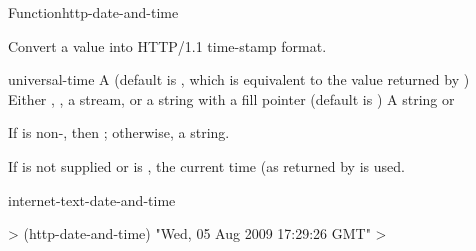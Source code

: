 \documentclass[10pt,twoside,english,pdftex]{article}
\begin{document}
\begin{functiondoc}{Function}{http-date-and-time}{%
    }
% 

\fnsyntax

\fnpurpose Convert a  value into HTTP/1.1 time-stamp format.

\fnpackage {}

\fnmodule {}

\fnargs
\begin{args}{universal-time}
 A  (default is \nil,
  which is equivalent to the value returned by
  )
\arg[destination] Either \nil, , a stream, or a string with a fill 
pointer (default is \nil)
\arg[result] A string or \nil{}
\end{args}

\fnreturns If  is non-\nil, then \nil; otherwise, a string.

\fndescription
{}%
%
If  is not supplied or is \nil, the current time
(as returned by  is used.

\begin{alsos}{internet-text-date-and-time}
\end{alsos}

\fnexample
%
\W\supp
\begin{example}
  > (http-date-and-time)
  "Wed, 05 Aug 2009 17:29:26 GMT"
  >
\end{example}

\end{functiondoc}

\end{document}
